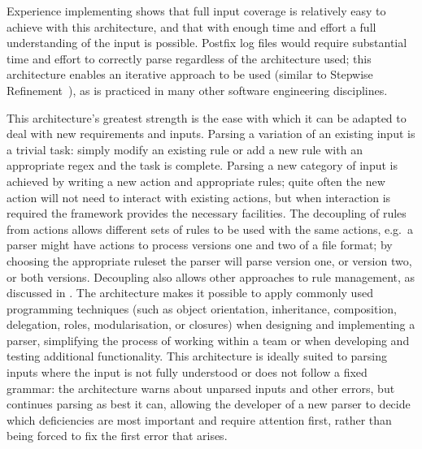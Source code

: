 Experience implementing \parsername{} shows that full input coverage is
relatively easy to achieve with this architecture, and that with enough
time and effort a full understanding of the input is possible.  Postfix log
files would require substantial time and effort to correctly parse
regardless of the architecture used; this architecture enables an iterative
approach to be used (similar to Stepwise
Refinement~\cite{stepwise-refinement}), as is practiced in many other
software engineering disciplines.


This architecture's greatest strength is the ease with which it can be
adapted to deal with new requirements and inputs.  Parsing a variation of
an existing input is a trivial task: simply modify an existing rule or add
a new rule with an appropriate regex and the task is complete.  Parsing a
new category of input is achieved by writing a new action and appropriate
rules; quite often the new action will not need to interact with existing
actions, but when interaction is required the framework provides the
necessary facilities.  The decoupling of rules from actions allows
different sets of rules to be used with the same actions, e.g.\ a parser
might have actions to process versions one and two of a file format; by
choosing the appropriate ruleset the parser will parse version one, or
version two, or both versions.  Decoupling also allows other approaches to
rule management, as discussed in .  The
architecture makes it possible to apply commonly used programming
techniques (such as object orientation, inheritance, composition,
delegation, roles, modularisation, or closures) when designing and
implementing a parser, simplifying the process of working within a team or
when developing and testing additional functionality.  This architecture is
ideally suited to parsing inputs where the input is not fully understood or
does not follow a fixed grammar: the architecture warns about unparsed
inputs and other errors, but continues parsing as best it can, allowing the
developer of a new parser to decide which deficiencies are most important
and require attention first, rather than being forced to fix the first
error that arises.

